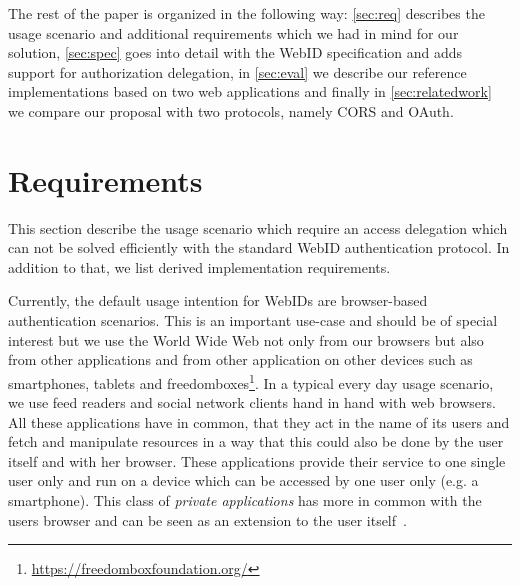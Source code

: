 \documentclass[a4paper]{llncs}
\begin{document}
The rest of the paper is organized in the following way:
\autoref{sec:req} describes the usage scenario and additional requirements which we had in mind for our solution,
\autoref{sec:spec} goes into detail with the WebID specification and adds support for authorization delegation,
in \autoref{sec:eval} we describe our reference implementations based on two web applications and finally
in \autoref{sec:relatedwork} we compare our proposal with two protocols, namely CORS and OAuth.



\section{Requirements}\label{sec:req}

This section describe the usage scenario which require an access delegation which can not be solved efficiently with the standard WebID authentication protocol.
In addition to that, we list derived implementation requirements.



Currently, the default usage intention for WebIDs are browser-based authentication scenarios.
This is an important use-case and should be of special interest but we use the World Wide Web not only from our browsers but also from other applications and from other application on other devices such as smartphones, tablets and freedomboxes\footnote{\url{https://freedomboxfoundation.org/}}.
In a typical every day usage scenario, we use feed readers and social network clients hand in hand with web browsers.
All these applications have in common, that they act in the name of its users and fetch and manipulate resources in a way that this could also be done by the user itself and with her browser.
These applications provide their service to one single user only and run on a device which can be accessed by one user only (e.g. a smartphone).
This class of \textit{private applications} has more in common with the users browser and can be seen as an extension to the user itself~\cite{clark-a-1998-7-a}.
\end{document}
